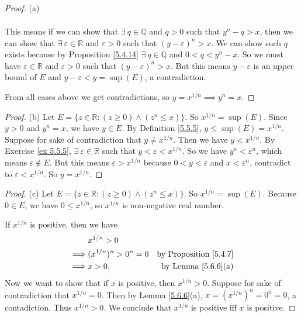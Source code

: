 \begin{proof}{(a)}
\begin{enumerate}[label=(\Roman*)]
\begin{align*}
    \end{align*}
    This means if we can show that \(\exists\ q \in \mathds{Q}\) and \(q > 0\) such that \(y^n - q > x\), then we can show that \(\exists\ \varepsilon \in \mathds{R}\) and \(\varepsilon > 0\) such that \((y - \varepsilon)^n > x\).
    We can show such \(q\) exists because by Proposition \ref{5.4.14} \(\exists\ q \in \mathds{Q}\) and \(0 < q < y^n - x\).
    So we must have \(\varepsilon \in \mathds{R}\) and \(\varepsilon > 0\) such that \((y - \varepsilon)^n > x\).
    But this means \(y - \varepsilon\) is an upper bound of \(E\) and \(y - \varepsilon < y = \sup(E)\), a contradiction.
\end{enumerate}
From all cases above we get contradictions, so \(y = x^{1 / n} \implies y^n = x\).
\end{proof}

\begin{proof}{(b)}
Let \(E = \{z \in \mathds{R} : (z \geq 0) \land (z^n \leq x)\}\).
So \(x^{1 / n} = \sup(E)\).
Since \(y > 0\) and \(y^n = x\), we have \(y \in E\).
By Definition \ref{5.5.5}, \(y \leq \sup(E) = x^{1 / n}\).
Suppose for sake of contradiction that \(y \neq x^{1 / n}\).
Then we have \(y < x^{1 / n}\).
By Exercise \ref{ex 5.5.5}, \(\exists\ \varepsilon \in \mathds{R}\) such that \(y < \varepsilon < x^{1 / n}\).
So we have \(y^n < \varepsilon^n\), which means \(\varepsilon \notin E\).
But this means \(\varepsilon > x^{1 / n}\) because \(0 < y < \varepsilon\) and \(x < \varepsilon^n\), contradict to \(\varepsilon < x^{1 / n}\).
So \(y = x^{1 / n}\).
\end{proof}

\begin{proof}{(c)}
Let \(E = \{z \in \mathds{R} : (z \geq 0) \land (z^n \leq x)\}\).
So \(x^{1 / n} = \sup(E)\).
Because \(0 \in E\), we have \(0 \leq x^{1 / n}\), so \(x^{1 / n}\) is non-negative real number.

If \(x^{1 / n}\) is positive, then we have
\begin{align*}
& x^{1 / n} > 0 \\
\implies & (x^{1 / n})^n > 0^n = 0 & \text{by Proposition \ref{5.4.7}} \\
\implies & x > 0. & \text{by Lemma \ref{5.6.6}(a)} \\
\end{align*}
Now we want to show that if \(x\) is positive, then \(x^{1 / n} > 0\).
Suppose for sake of contradiction that \(x^{1 / n} = 0\).
Then by Lemma \ref{5.6.6}(a), \(x = (x^{1 / n})^n = 0^n = 0\), a contadiction.
Thus \(x^{1 / n} > 0\).
We conclude that \(x^{1 / n}\) is positive iff \(x\) is positive.
\end{proof}

